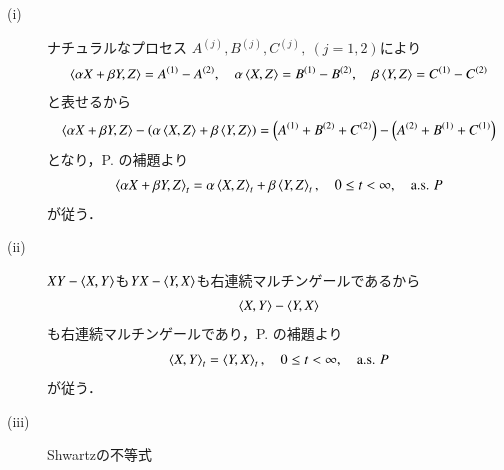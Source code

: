 	\begin{prf}\mbox{}
		\begin{description}
			\item[(i)] ナチュラルなプロセス
				$A^{(j)},B^{(j)},C^{(j)},\ (j=1,2)$により
				\begin{align}
					\inprod<\alpha X + \beta Y, Z> = A^{(1)} - A^{(2)},
					\quad \alpha \inprod<X,Z> = B^{(1)} - B^{(2)},
					\quad \beta \inprod<Y,Z> = C^{(1)} - C^{(2)}
				\end{align}
				と表せるから
				\begin{align}
					\inprod<\alpha X + \beta Y, Z> 
					- \left(\alpha \inprod<X,Z> + \beta \inprod<Y,Z>\right)
					= \left(A^{(1)} + B^{(2)} + C^{(2)}\right)
					- \left(A^{(2)} + B^{(1)} + C^{(1)}\right)
				\end{align}
				となり，P. \pageref{lem:uniqueness_of_Doob_Meyer_decomposition}の補題より
				\begin{align}
					\inprod<\alpha X + \beta Y, Z>_t 
					= \alpha \inprod<X,Z>_t + \beta \inprod<Y,Z>_t,
					\quad 0 \leq t < \infty,
					\quad \mbox{a.s. $P$}
				\end{align}
				が従う．
			
			\item[(ii)] 
				$XY - \inprod<X,Y>$も$YX - \inprod<Y,X>$も右連続マルチンゲールであるから
				\begin{align}
					\inprod<X,Y> - \inprod<Y,X>
				\end{align}
				も右連続マルチンゲールであり，P. \pageref{lem:uniqueness_of_Doob_Meyer_decomposition}の補題より
				\begin{align}
					\inprod<X,Y>_t = \inprod<Y,X>_t,
					\quad 0 \leq t < \infty,
					\quad \mbox{a.s. $P$}
				\end{align}
				が従う．

			\item[(iii)] Shwartzの不等式
		\end{description}
	\end{prf}
	
	\begin{itembox}[l]{}
		
	\end{itembox}